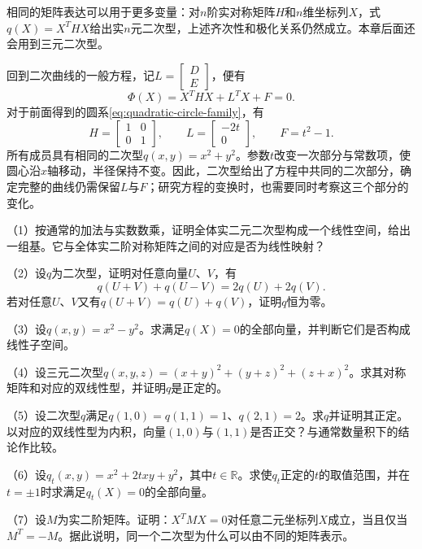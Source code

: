 相同的矩阵表达可以用于更多变量：对\(n\)阶实对称矩阵\(H\)和\(n\)维坐标列\(X\)，式\(q(X) = X^{T} H X\)给出实\(n\)元二次型，上述齐次性和极化关系仍然成立。本章后面还会用到三元二次型。

回到二次曲线的一般方程，记\(L = \left[\begin{matrix}D \\ E\end{matrix}\right]\)，便有
\begin{equation}
    \Phi(X) = X^{T} H X + L^{T}X + F = 0 .
\end{equation}
对于前面得到的圆系\eqref{eq:quadratic-circle-family}，有
\begin{equation}
    H = \left[\begin{matrix}1 & 0 \\ 0 & 1\end{matrix}\right] , \qquad
    L = \left[\begin{matrix}-2t \\ 0\end{matrix}\right] , \qquad F = t^{2}-1 .
\end{equation}
所有成员具有相同的二次型\(q(x,y) = x^{2} + y^{2}\)。参数\(t\)改变一次部分与常数项，使圆心沿\(x\)轴移动，半径保持不变。因此，二次型给出了方程中共同的二次部分，确定完整的曲线仍需保留\(L\)与\(F\)；研究方程的变换时，也需要同时考察这三个部分的变化。

\begin{exercise}
\mbox{}

（1）按通常的加法与实数数乘，证明全体实二元二次型构成一个线性空间，给出一组基。它与全体实二阶对称矩阵之间的对应是否为线性映射？

（2）设\(q\)为二次型，证明对任意向量\(U\)、\(V\)，有
\begin{equation*}
    q(U+V)+q(U-V)=2q(U)+2q(V) .
\end{equation*}
若对任意\(U\)、\(V\)又有\(q(U+V)=q(U)+q(V)\)，证明\(q\)恒为零。

（3）设\(q(x,y)=x^{2}-y^{2}\)。求满足\(q(X)=0\)的全部向量，并判断它们是否构成线性子空间。

（4）设三元二次型\(q(x,y,z)=(x+y)^{2}+(y+z)^{2}+(z+x)^{2}\)。求其对称矩阵和对应的双线性型，并证明\(q\)是正定的。

（5）设二次型\(q\)满足\(q(1,0)=q(1,1)=1\)、\(q(2,1)=2\)。求\(q\)并证明其正定。以对应的双线性型为内积，向量\((1,0)\)与\((1,1)\)是否正交？与通常数量积下的结论作比较。

（6）设\(q_t(x,y)=x^{2}+2txy+y^{2}\)，其中\(t\in\mathbb{R}\)。求使\(q_t\)正定的\(t\)的取值范围，并在\(t=\pm1\)时求满足\(q_t(X)=0\)的全部向量。

（7）设\(M\)为实二阶矩阵。证明：\(X^{T}MX=0\)对任意二元坐标列\(X\)成立，当且仅当\(M^{T}=-M\)。据此说明，同一个二次型为什么可以由不同的矩阵表示。
\end{exercise}
